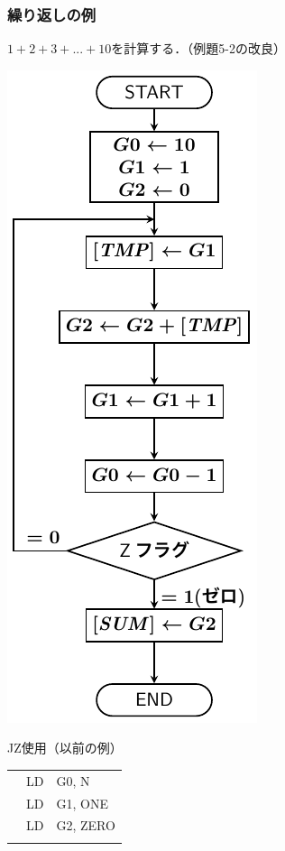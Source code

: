 \documentclass{beamer}                 %
\begin{document}
\begin{frame}
  \frametitle{繰り返しの例}
  $1 + 2 + 3 + ... + 10$を計算する．（例題5-2の改良）\\
  \vfill
  \begin{minipage}{0.26\columnwidth}
    \centerline{\includegraphics[scale=0.55]{../Tikz/flow3A.pdf}}
  \end{minipage}
  \begin{minipage}{0.36\columnwidth}
    {\ttfamily JZ使用（以前の例）\\\scriptsize
      \begin{tabular}{|l|l|l|}
              & LD     & G0, N    \\
              & LD     & G1, ONE  \\
              & LD     & G2, ZERO \\
              &        &          \\

\end{tabular}}
\end{minipage}
\end{frame}
\end{document}
